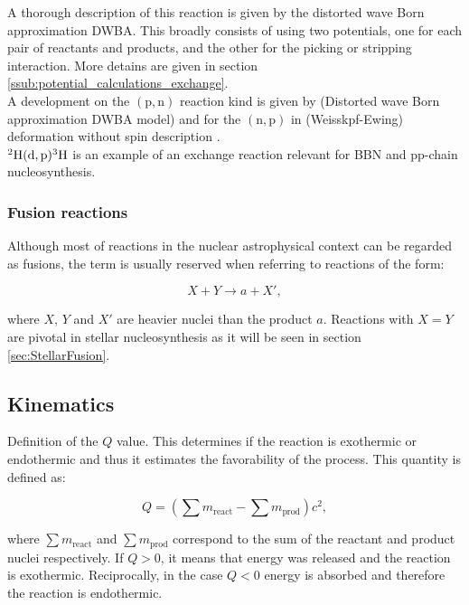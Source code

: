 \documentclass[openany]{book}
\begin{document}
A thorough description of this reaction is given by the distorted wave Born approximation DWBA. This broadly consists of using two potentials, one for each pair of reactants and products, and the other for the picking or stripping interaction. More detains are given in section \ref{ssub:potential_calculations_exchange}. \\

A development on the $\mathrm{(p,n)}$ reaction kind is given by (Distorted wave Born approximation DWBA model) \cite{whitehead_poxon-pearson_nunes_potel_2022} and for the $\mathrm{(n,p)}$ in (Weisskpf-Ewing) deformation without spin description \cite{sharma_gandhi_kumar_2022}. \\

$\mathrm{{}^{2}H(d, p){}^{3}H}$ is an example of an exchange reaction relevant for BBN and pp-chain nucleosynthesis. 


\subsubsection{Fusion reactions} \label{ssub:fusionReactions}

Although most of reactions in the nuclear astrophysical context can be regarded as fusions, the term is usually reserved when referring to reactions of the form:

\begin{equation}  \label{eq:nuclearReaction_fusion}
	X + Y \rightarrow a + X',
\end{equation}

where $X$, $Y$ and $X'$ are heavier nuclei than the product $a$. Reactions with $X = Y$ are pivotal in stellar nucleosynthesis as it will be seen in section \ref{sec:StellarFusion}.

\subsection{Kinematics} \label{sub:kinematics}

Definition of the $Q$ value. This determines if the reaction is exothermic or endothermic and thus it estimates the favorability of the process. This quantity is defined as: 

\begin{equation}\label{eq:nuclearReaction_Qvalue}
	Q = (\sum m_{\mathrm{react}} - \sum m_{\mathrm{prod}})c^2,
\end{equation}

where $\sum m_{\mathrm{react}}$ and  $\sum m_{\mathrm{prod}}$ correspond to the sum of the reactant and product nuclei respectively. If $Q > 0$, it means that energy was released and the reaction is exothermic. Reciprocally, in the case $Q < 0$ energy is absorbed and therefore the reaction is endothermic.  \\
\end{document}
